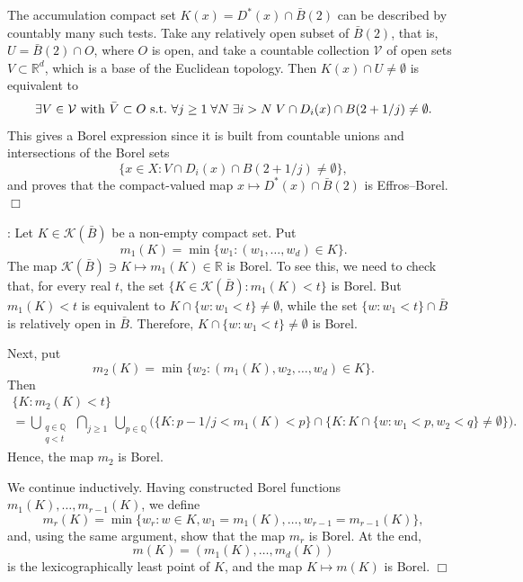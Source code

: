 \documentclass[11pt]{paper}
\newcommand{\bR}{\mathbb R}
\newcommand{\bQ}{\mathbb Q}
\begin{document}
The accumulation compact set $K(x)=D^*(x)\cap \bar B(2)$ can be described by countably many
such tests. Take any relatively open subset of $\bar B(2)$, that is, $U=\bar B(2)\cap O$,
where $O$ is open, and take a countable collection $\mathcal V$ of open sets $V\subset \bR^d$,
which is a base of the Euclidean topology. Then $K(x)\cap U \ne \emptyset$ is equivalent to
\[
\exists V\in\mathcal V\ {\rm with\ } \bar V\subset O \ {\rm s.t.\ }
\forall j\ge 1\; \forall N \; \exists i>N \; V\cap D_i(x)\cap B(2+1/j)\ne \emptyset.
\]
This gives a Borel expression since it is built from countable unions and intersections of
the Borel sets \[ \{x\in X\colon V\cap D_i(x)\cap B(2+1/j)\ne \emptyset \}, \]
and proves that the compact-valued map $x\mapsto D^*(x)\cap\bar B(2)$ is Effros--Borel.
\mbox{} \hfill $\Box$

\medskip{}:
Let $K \in \mathcal K(\bar B)$ be a non-empty compact set. Put
\[
m_1(K) = \min \{w_1\colon (w_1, \ldots , w_d)\in K\}.
\]
The map $\mathcal K(\bar B)\ni K\mapsto m_1(K) \in \bR$ is Borel. To see this, we need
to check that, for every real $t$, the set $\{K\in\mathcal K(\bar B)\colon m_1(K)<t\}$ is
Borel. But $m_1(K)<t$ is equivalent to $K\cap \{w\colon w_1<t\}\ne \emptyset$, while the
set $ \{w\colon w_1<t\} \cap \bar B$ is relatively open in $\bar B$. Therefore,
$K\cap \{w\colon w_1<t\}\ne \emptyset$ is Borel.

Next, put
\[
m_2(K)   = \min \{w_2\colon (m_1(K), w_2, \ldots , w_d)\in K\}.
\]
Then
\begin{multline*}
\{K\colon m_2(K)<t\} \\
= \bigcup_{\substack {q\in \bQ \\ q<t}}\ \bigcap_{j\ge 1}\ \bigcup_{p\in\bQ}
\bigl( \{K\colon p - 1/j < m_1(K) < p \} \cap \{K\colon K\cap\{w\colon w_1<p, w_2<q \}\ne \emptyset\}
\bigr).
\end{multline*}
Hence, the map $m_2$ is Borel.

We continue inductively. Having constructed Borel functions $m_1(K), \ldots , m_{r-1}(K)$,
we define
\[
m_r(K) = \min\{w_r \colon w\in K, w_1=m_1(K), \ldots , w_{r-1} = m_{r-1}(K)\},
\]
and, using the same argument, show that the map $m_r$ is Borel. At the end,
\[ m (K) = (m_1(K), \ldots , m_d(K)) \] is the lexicographically least point of $K$, and the map
$K\mapsto m(K)$ is Borel.  \mbox{}\hfill $\Box$
\end{document}
